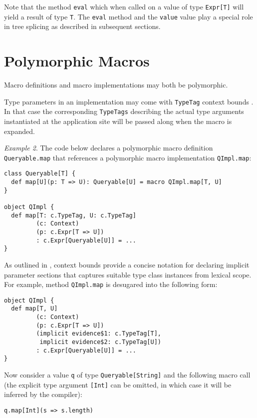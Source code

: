 \documentclass{llncs}
\begin{document}
Note that the method \lstinline$eval$ which when called on a value of type \lstinline$Expr[T]$ will yield a result of type \lstinline$T$. The \lstinline$eval$ method and the \lstinline$value$ value play a special role in tree splicing as described in subsequent sections.

\section{Polymorphic Macros}

Macro definitions and macro implementations may both be polymorphic.

Type parameters in an implementation may come with \lstinline$TypeTag$ context bounds \cite{oliveira10}. In that case the corresponding \lstinline$TypeTags$ describing the actual type arguments instantiated at the application site will be passed along when the macro is expanded.

\emph{Example 2}. The code below declares a polymorphic macro definition \lstinline$Queryable.map$ that references a polymorphic macro implementation \lstinline$QImpl.map$:

\begin{lstlisting}
class Queryable[T] {
  def map[U](p: T => U): Queryable[U] = macro QImpl.map[T, U]
}

object QImpl {
  def map[T: c.TypeTag, U: c.TypeTag]
         (c: Context)
         (p: c.Expr[T => U])
         : c.Expr[Queryable[U]] = ...
}
\end{lstlisting}

As outlined in \cite{oliveira10}, context bounds provide a concise notation for declaring implicit parameter sections that captures suitable type class instances from lexical scope. For example, method \lstinline$QImpl.map$ is desugared into the following form:

\begin{lstlisting}
object QImpl {
  def map[T, U]
         (c: Context)
         (p: c.Expr[T => U])
         (implicit evidence$1: c.TypeTag[T],
          implicit evidence$2: c.TypeTag[U])
         : c.Expr[Queryable[U]] = ...
}
\end{lstlisting}

Now consider a value \lstinline$q$ of type \lstinline$Queryable[String]$ and the following macro call (the explicit type argument \lstinline$[Int]$ can be omitted, in which case it will be inferred by the compiler):

\begin{lstlisting}
q.map[Int](s => s.length)
\end{lstlisting}
\end{document}
